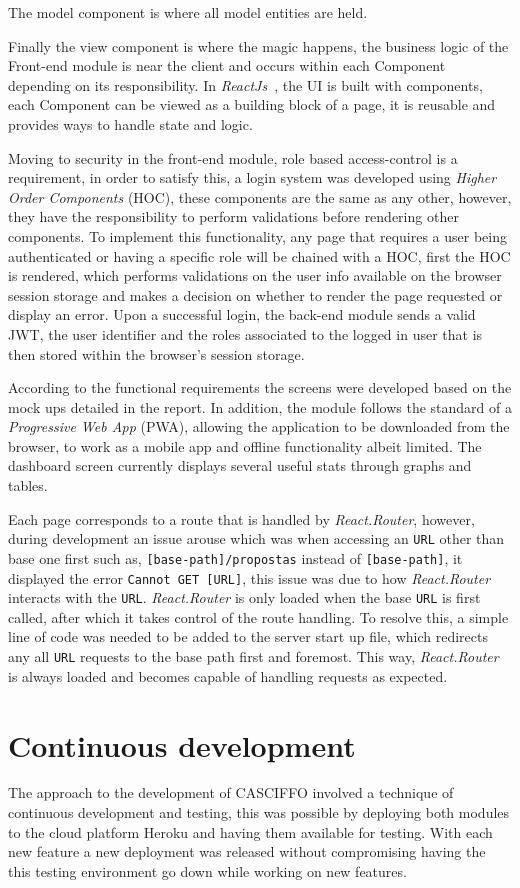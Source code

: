 The model component is where all model entities are held. 

Finally the view component is where the magic happens, the business logic of the Front-end module is near the client and occurs within each Component depending on its responsibility.
In \textit{ReactJs}~\cite{reactjs}, the UI is built with components, each Component can be viewed as a building block of a page, it is reusable and provides ways to handle state and logic.

Moving to security in the front-end module, role based access-control is a requirement, in order to satisfy this, a login system was developed using \textit{Higher Order Components} (HOC), these components are the same as any other, however, they have the responsibility to perform validations before rendering other components. To implement this functionality, any page that requires a user being authenticated or having a specific role will be chained with a HOC, first the HOC is rendered, which performs validations on the user info available on the browser session storage and makes a decision on whether to render the page requested or display an error.
Upon a successful login, the back-end module sends a valid JWT, the user identifier and the roles associated to the logged in user that is then stored within the browser's session storage.

According to the functional requirements the screens were developed based on the mock ups detailed in the report. In addition, the module follows the standard of a \textit{Progressive Web App} (PWA), allowing the application to be downloaded from the browser, to work as a mobile app and offline functionality albeit limited. The dashboard screen currently displays several useful stats through graphs and tables.

Each page corresponds to a route that is handled by \textit{React.Router}, however, during development an issue arouse which was when accessing an \texttt{URL} other than base one first such as, \texttt{[base-path]/propostas} instead of \texttt{[base-path]}, it displayed the error \texttt{Cannot GET [URL]}, this issue was due to how \textit{React.Router} interacts with the \texttt{URL}.
\textit{React.Router} is only loaded when the base \texttt{URL} is first called, after which it takes control of the route handling. To resolve this, a simple line of code was needed to be added to the server start up file, which redirects any all \texttt{URL} requests to the base path first and foremost. This way, \textit{React.Router} is always loaded and becomes capable of handling requests as expected.


\section{Continuous development}

The approach to the development of CASCIFFO involved a technique of continuous development and testing, this was possible by deploying both modules to the cloud platform Heroku and having them available for testing. With each new feature a new deployment was released without compromising having the this testing environment go down while working on new features. 
